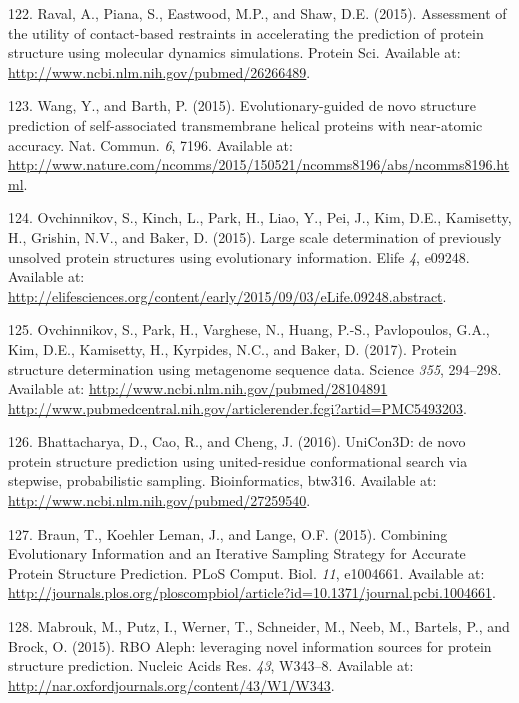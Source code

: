 \documentclass[11pt,a4paper,twoside]{book}
\theoremstyle{definition}
\theoremstyle{definition}
\theoremstyle{remark}
\begin{document}
\hypertarget{ref-Raval2015a}{}
122. Raval, A., Piana, S., Eastwood, M.P., and Shaw, D.E. (2015).
Assessment of the utility of contact-based restraints in accelerating
the prediction of protein structure using molecular dynamics
simulations. Protein Sci. Available at:
\url{http://www.ncbi.nlm.nih.gov/pubmed/26266489}.

\hypertarget{ref-Wang2015}{}
123. Wang, Y., and Barth, P. (2015). Evolutionary-guided de novo
structure prediction of self-associated transmembrane helical proteins
with near-atomic accuracy. Nat. Commun. \emph{6}, 7196. Available at:
\url{http://www.nature.com/ncomms/2015/150521/ncomms8196/abs/ncomms8196.html}.

\hypertarget{ref-Ovchinnikov2015a}{}
124. Ovchinnikov, S., Kinch, L., Park, H., Liao, Y., Pei, J., Kim, D.E.,
Kamisetty, H., Grishin, N.V., and Baker, D. (2015). Large scale
determination of previously unsolved protein structures using
evolutionary information. Elife \emph{4}, e09248. Available at:
\url{http://elifesciences.org/content/early/2015/09/03/eLife.09248.abstract}.

\hypertarget{ref-Ovchinnikov2017}{}
125. Ovchinnikov, S., Park, H., Varghese, N., Huang, P.-S., Pavlopoulos,
G.A., Kim, D.E., Kamisetty, H., Kyrpides, N.C., and Baker, D. (2017).
Protein structure determination using metagenome sequence data. Science
\emph{355}, 294--298. Available at:
\href{http://www.ncbi.nlm.nih.gov/pubmed/28104891\%20http://www.pubmedcentral.nih.gov/articlerender.fcgi?artid=PMC5493203}{http://www.ncbi.nlm.nih.gov/pubmed/28104891 http://www.pubmedcentral.nih.gov/articlerender.fcgi?artid=PMC5493203}.

\hypertarget{ref-Bhattacharya2016}{}
126. Bhattacharya, D., Cao, R., and Cheng, J. (2016). UniCon3D: de novo
protein structure prediction using united-residue conformational search
via stepwise, probabilistic sampling. Bioinformatics, btw316. Available
at: \url{http://www.ncbi.nlm.nih.gov/pubmed/27259540}.

\hypertarget{ref-Braun2015}{}
127. Braun, T., Koehler Leman, J., and Lange, O.F. (2015). Combining
Evolutionary Information and an Iterative Sampling Strategy for Accurate
Protein Structure Prediction. PLoS Comput. Biol. \emph{11}, e1004661.
Available at:
\url{http://journals.plos.org/ploscompbiol/article?id=10.1371/journal.pcbi.1004661}.

\hypertarget{ref-Mabrouk2015a}{}
128. Mabrouk, M., Putz, I., Werner, T., Schneider, M., Neeb, M.,
Bartels, P., and Brock, O. (2015). RBO Aleph: leveraging novel
information sources for protein structure prediction. Nucleic Acids Res.
\emph{43}, W343--8. Available at:
\url{http://nar.oxfordjournals.org/content/43/W1/W343}.
\end{document}
